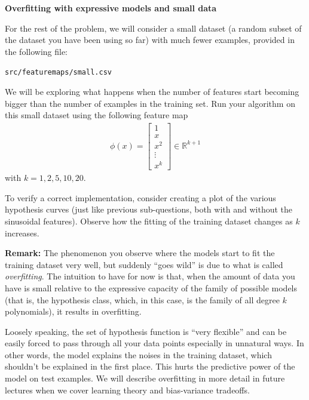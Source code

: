 \item {} {\bf Overfitting with expressive models and small data}

For the rest of the problem, we will consider a small
dataset (a random subset of the dataset you have been using so far) with much fewer examples, provided in
the following file:
%
\begin{center}
	\texttt{src/featuremaps/small.csv}
\end{center}
%

We will be exploring what happens when the number of features start becoming bigger than the number of 
examples in the training set. Run your algorithm on this small dataset using the following feature map 
\begin{align}
\phi(x) = \left[\begin{array}{c} 1\\ x \\ x^2\\ \vdots \\x^k \end{array}\right]\in \mathbb{R}^{k+1} 
\end{align}
with $k = 1,2,5,10,20$. 

To verify a correct implementation, consider creating a plot of the various hypothesis curves (just like previous sub-questions, both with and without the sinusoidal features). Observe how the fitting of the training dataset changes as $k$ increases.

\textbf{Remark: } The phenomenon you observe where the models start to fit the training dataset very well, but suddenly ``goes wild'' is due to what is called \emph{overfitting}. The intuition to have for now is that, when the amount of data you have is small relative to the expressive capacity of the family of possible models (that is, the hypothesis class, which, in this case, is the family of all degree $k$ polynomials), it results in overfitting.  

Loosely speaking, the set of hypothesis function is ``very flexible'' and can be easily forced to pass through all your data points especially in unnatural ways. In other words, the  model explains the noises in the training dataset, which shouldn't be explained in the first place. This hurts the predictive power of the model on test examples. We will describe overfitting in more detail in future lectures when we cover learning theory and bias-variance tradeoffs.\\

